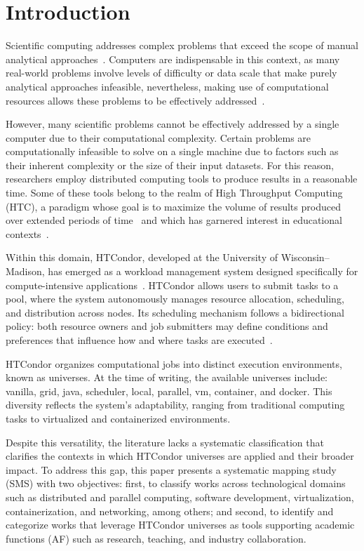 \section{Introduction}
\label{sec:introduccion}
Scientific computing addresses complex problems that exceed the scope of manual analytical approaches~\cite{landau01}. Computers are indispensable in this context, as many real-world problems involve levels of difficulty or data scale that make purely analytical approaches infeasible, nevertheless, making use of computational resources allows these problems to be effectively addressed~\cite{landau01}.

However, many scientific problems cannot be effectively addressed by a single computer due to their computational complexity. Certain problems are computationally infeasible to solve on a single machine due to factors such as their inherent complexity or the size of their input datasets. For this reason, researchers employ distributed computing tools to produce results in a reasonable time. Some of these tools belong to the realm of High Throughput Computing (HTC), a paradigm whose goal is to maximize the volume of results produced over extended periods of time~\cite{juve-01} and which has garnered interest in educational contexts~\cite{Senol-01}.

Within this domain, HTCondor, developed at the University of Wisconsin–Madison, has emerged as a workload management system designed specifically for compute-intensive applications~\cite{chang-01, htcondor-description}. HTCondor allows users to submit tasks to a pool, where the system autonomously manages resource allocation, scheduling, and distribution across nodes. Its scheduling mechanism follows a bidirectional policy: both resource owners and job submitters may define conditions and preferences that influence how and where tasks are executed~\cite{htcondor-description}.

HTCondor organizes computational jobs into distinct execution environments, known as universes. At the time of writing, the available universes include: vanilla, grid, java, scheduler, local, parallel, vm, container, and docker. This diversity reflects the system’s adaptability, ranging from traditional computing tasks to virtualized and containerized environments.

Despite this versatility, the literature lacks a systematic classification that clarifies the contexts in which HTCondor universes are applied and their broader impact. To address this gap, this paper presents a systematic mapping study (SMS) with two objectives: first, to classify works across technological domains such as distributed and parallel computing, software development, virtualization, containerization, and networking, among others; and second, to identify and categorize works that leverage HTCondor universes as tools supporting academic functions (AF) such as research, teaching, and industry collaboration.


